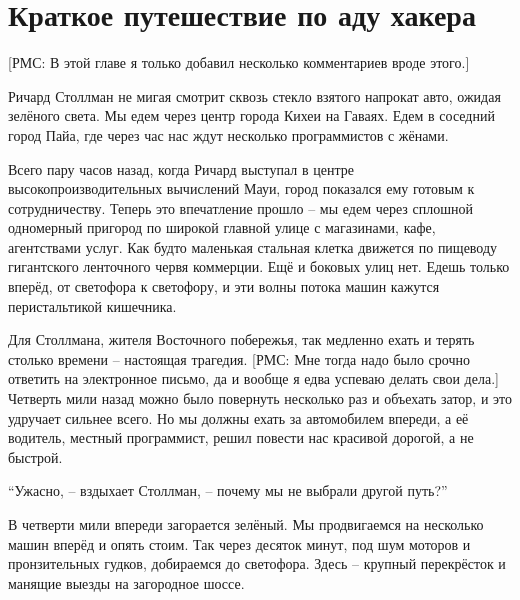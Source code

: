 

\chapter{Краткое путешествие по аду хакера}

[РМС: В этой главе я только добавил несколько комментариев вроде этого.]

Ричард Столлман не мигая смотрит сквозь стекло взятого напрокат авто, ожидая зелёного света. Мы едем через центр города Кихеи на Гаваях. Едем в соседний город Пайа, где через час нас ждут несколько программистов с жёнами.

Всего пару часов назад, когда Ричард выступал в центре высокопроизводительных вычислений Мауи, город показался ему готовым к сотрудничеству. Теперь это впечатление прошло -- мы едем через сплошной одномерный пригород по широкой главной улице с магазинами, кафе, агентствами услуг. Как будто маленькая стальная клетка движется по пищеводу гигантского ленточного червя коммерции. Ещё и боковых улиц нет. Едешь только вперёд, от светофора к светофору, и эти волны потока машин кажутся перистальтикой кишечника.

Для Столлмана, жителя Восточного побережья, так медленно ехать и терять столько времени -- настоящая трагедия. [РМС: Мне тогда надо было срочно ответить на электронное письмо, да и вообще я едва успеваю делать свои дела.] Четверть мили назад можно было повернуть несколько раз и объехать затор, и это удручает сильнее всего. Но мы должны ехать за автомобилем впереди, а её водитель, местный программист, решил повести нас красивой дорогой, а не быстрой.

\enquote{Ужасно, -- вздыхает Столлман, -- почему мы не выбрали другой путь?}

В четверти мили впереди загорается зелёный. Мы продвигаемся на несколько машин вперёд и опять стоим. Так через десяток минут, под шум моторов и пронзительных гудков, добираемся до светофора. Здесь -- крупный перекрёсток и манящие выезды на загородное шоссе.

